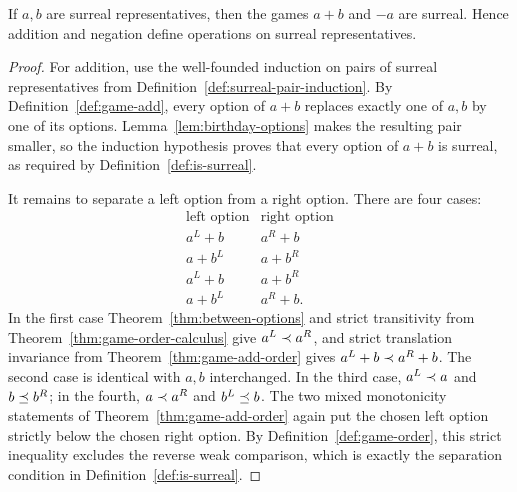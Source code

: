 \begin{theorem}
  \label{thm:surreal-add-closure}
  \leanok
  If \(a,b\) are surreal representatives, then the games \(a+b\) and \(-a\) are surreal.
  Hence addition and negation define operations on surreal representatives.
\end{theorem}
\begin{proof}
  \leanok
  For addition, use the well-founded induction on pairs of surreal
  representatives from Definition~\ref{def:surreal-pair-induction}.  By
  Definition~\ref{def:game-add}, every option of \(a+b\) replaces exactly one
  of \(a,b\) by one of its options.  Lemma~\ref{lem:birthday-options} makes
  the resulting pair smaller, so the induction hypothesis proves that every
  option of \(a+b\) is surreal, as required by
  Definition~\ref{def:is-surreal}.

  It remains to separate a left option from a right option.  There are four
  cases:
  \[
    \begin{array}{c|c}
      \text{left option}&\text{right option}\\ \hline
      a^L+b&a^R+b\\
      a+b^L&a+b^R\\
      a^L+b&a+b^R\\
      a+b^L&a^R+b.
    \end{array}
  \]
  In the first case Theorem~\ref{thm:between-options} and strict transitivity
  from Theorem~\ref{thm:game-order-calculus} give
  \(a^L\prec a^R\), and strict translation invariance from
  Theorem~\ref{thm:game-add-order} gives
  \(a^L+b\prec a^R+b\).  The second case is identical with \(a,b\)
  interchanged.  In the third case,
  \(a^L\prec a\) and \(b\preceq b^R\); in the fourth,
  \(a\prec a^R\) and \(b^L\preceq b\).  The two mixed monotonicity
  statements of Theorem~\ref{thm:game-add-order} again put the chosen left
  option strictly below the chosen right option.  By
  Definition~\ref{def:game-order}, this strict inequality excludes the reverse
  weak comparison, which is exactly the separation condition in
  Definition~\ref{def:is-surreal}.


\end{proof}
